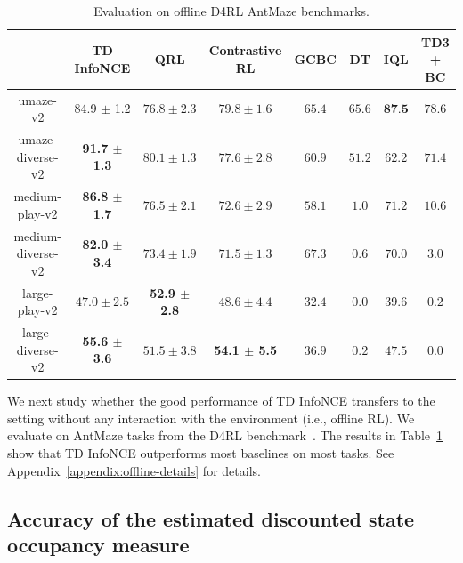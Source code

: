 \documentclass{article} %
\begin{document}
\begin{table}[t]
\caption{\footnotesize Evaluation on offline D4RL AntMaze benchmarks.}
\vspace{-1.5em}
\label{tab:offline-eval}
\begin{center}
\begin{small}
\setlength{\tabcolsep}{5pt}
\begin{tabular}{c|ccccccc}
\toprule
 & TD InfoNCE & QRL & Contrastive RL & GCBC & DT & IQL & TD3 + BC \\ 
\midrule
umaze-v2 & 84.9 $\pm$ 1.2 & $76.8 \pm 2.3$ & $79.8 \pm 1.6$ &  $65.4$ & $65.6$ & $\textbf{87.5}$ & $78.6$ \\
umaze-diverse-v2 & \textbf{91.7 $\pm$ 1.3} & $80.1 \pm 1.3$ & $77.6 \pm 2.8$ & $ 60.9$ & $51.2$ & $ 62.2$ & $71.4$ \\ 
medium-play-v2 & \textbf{86.8 $\pm$ 1.7} & $76.5 \pm 2.1$ & $72.6 \pm 2.9$ & $58.1$ & $1.0$ & $71.2$ & $10.6$ \\
medium-diverse-v2 & \textbf{82.0 $\pm$ 3.4} & $73.4 \pm 1.9$ & $71.5 \pm 1.3$ & $67.3$ & $0.6$ & $70.0$ & $3.0$ \\
large-play-v2 & $47.0 \pm 2.5$ & \textbf{52.9 $\pm$ 2.8} & $48.6 \pm 4.4$ & $32.4$ & $0.0$ & $39.6$ & $0.2$ \\
large-diverse-v2 & \textbf{55.6 $\pm$ 3.6} & $51.5 \pm 3.8$ & \textbf{54.1 $\pm$ 5.5} & $36.9$ & $0.2$ & $47.5$ & $0.0$ \\
\bottomrule
\end{tabular}
\end{small}
\end{center}
\end{table}

We next study whether the good performance of TD InfoNCE transfers to the setting without any interaction with the environment (i.e., offline RL). We evaluate on AntMaze tasks from the D4RL benchmark~\citep{fu2020d4rl}. The results in Table~\ref{tab:offline-eval} show that TD InfoNCE outperforms most baselines on most tasks. See Appendix~\ref{appendix:offline-details} for details.

\subsection{Accuracy of the estimated discounted state occupancy measure}
\label{subsec:critic-pred-acc}
\end{document}
